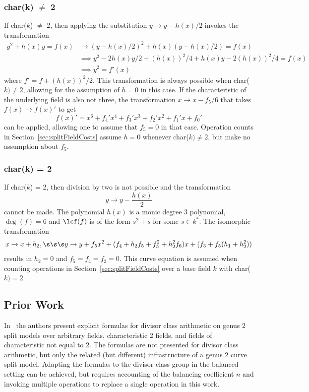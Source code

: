 \subsubsection{char(k) $\neq$ 2}
If char($k$) $\neq$ 2, then applying the substitution $y \rightarrow y - h(x)/2$
invokes the transformation 
\begin{align*}
y^2 + h(x)y = f(x) &\rightarrow (y-h(x)/2)^2 + h(x)(y - h(x)/2) = f(x) \\
                   &\implies y^2 -2h(x)y/2 + (h(x))^2/4 + h(x)y -2(h(x))^2/4 = f(x) \\
                   &\implies y^2 = f'(x)
\end{align*} 
where $f' = f + (h(x))^2/2$. This transformation is always possible when
char($k) \neq 2$, allowing for the assumption of $h=0$ in this case.  If the
characteristic of the underlying field is also not three, the transformation $ x
\rightarrow x - f_5/6 $ that takes $f(x) \rightarrow f(x)'$ to get $$ f(x)' =
x^6 + f_4'x^4 + f_3'x^3 + f_2'x^2 + f_1'x + f_0'$$ can be applied, allowing one
to assume that $f_5 = 0$ in that case. Operation counts in
Section~\ref{sec:splitFieldCosts} assume $h = 0$ whenever char($k) \neq 2$, but
make no assumption about $f_5$.

\subsubsection{char(k) = 2}
If char($k$) = 2, then division by two is not possible and the transformation $$
y \rightarrow y - \frac{h(x)}{2}$$ cannot be made. The polynomial $h(x)$ is a
monic degree 3 polynomial, $\deg(f) = 6$ and $\lcf(f)$ is of the form $s^2 + s$
for some $s \in k^*$. The  isomorphic transformation $$ x \rightarrow x + h_2,
\s\s\s y \rightarrow y +f_5x^2 + (f_4 + h_2f_5 + f_5^2 + h_2^2f_6)x + (f_3 +
f_5(h_1 + h_2^2))$$ results in $h_2 = 0$  and $f_5 = f_4 = f_3 = 0$. This curve
equation is assumed when counting operations in
Section~\ref{sec:splitFieldCosts} over a base field $k$ with char($k) = 2$. 

\subsection{Prior Work}
\label{sec:explSPLITPriorWork}

In~\cite{EricksonJacobsonStein_realg2_2011} the authors present explicit
formulas for divisor class arithmetic on genus 2 split models over arbitrary
fields, characteristic 2 fields, and fields of characteristic not equal to 2.
The formulas are not presented for divisor class arithmetic, but only the
related (but different) infrastructure of a genus 2 curve split model. Adapting
the formulas to the divisor class group in the balanced setting can be achieved,
but requires accounting of the balancing coefficient $n$ and invoking multiple
operations to replace a single operation in this work. 

